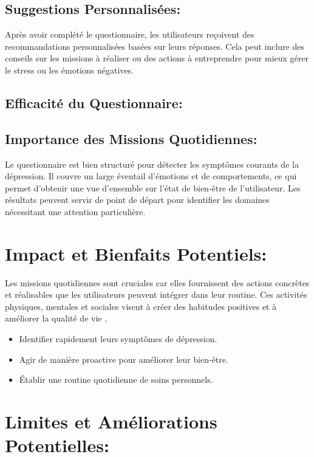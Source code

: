 \documentclass[12pt, openany]{report}
\begin{document}
\subsection{\color{red}Suggestions Personnalisées:}
Après avoir complété le questionnaire, les utilisateurs reçoivent des recommandations personnalisées basées sur leurs réponses. Cela peut inclure des conseils sur les missions à réaliser ou des actions à entreprendre pour mieux gérer le stress ou les émotions négatives.

\subsection{\color{red}Efficacité du Questionnaire:}

\subsection{\color{red}Importance des Missions Quotidiennes:}
Le questionnaire est bien structuré pour détecter les symptômes courants de la dépression. Il couvre un large éventail d'émotions et de comportements, ce qui permet d'obtenir une vue d'ensemble sur l'état de bien-être de l'utilisateur. Les résultats peuvent servir de point de départ pour identifier les domaines nécessitant une attention particulière.


\section{\color{red}Impact et Bienfaits Potentiels:}
Les missions quotidiennes sont cruciales car elles fournissent des actions concrètes et réalisables que les utilisateurs peuvent intégrer dans leur routine. Ces activités physiques, mentales et sociales visent à créer des habitudes positives et à améliorer la qualité de vie .

\begin{itemize}
    \item Identifier rapidement leurs symptômes de dépression.
    \item Agir de manière proactive pour améliorer leur bien-être.
    \item Établir une routine quotidienne de soins personnels.
\end{itemize}

\section{\color{red} Limites et Améliorations Potentielles: }
\end{document}
